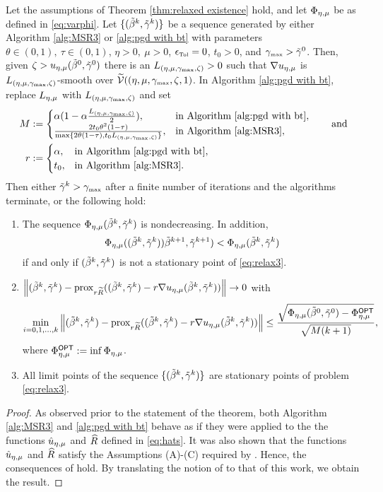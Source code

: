 \begin{theorem}\label{thm:convergence}
Let the assumptions of Theorem \ref{thm:relaxed existence} hold, and
let $\Phi_{\eta,\mu}$ be as defined in \eqref{eq:varphi}. 
Let $\{(\tilde\beta^k,{\tilde{\gamma}}^k)\}$ be a sequence generated
by either Algorithm \ref{alg:MSR3} or \ref{alg:pgd with bt} 
with parameters 
$\theta\in(0,1),\ \tau\in(0,1)$,
$\eta>0,\ \mu>0$, $\epsilon_{\mbox{\tiny Tol}}=0$,
$t_0>0$, and ${\gamma_{\mbox{\tiny max}}}>{\tilde{\gamma}}^0$. 
Then, given $\zeta>{u_{\eta,\mu}}(\tilde\beta^0,{\tilde{\gamma}}^0)$ there is an 
$L_{({\eta,\mu},{\gamma_{\mbox{\tiny max}}},\zeta)}>0$ such that $\nabla{u_{\eta,\mu}}$ is 
$L_{({\eta,\mu},{\gamma_{\mbox{\tiny max}}},\zeta)}$-smooth over 
$\widetilde{{\mathcal{V}}}(({\eta,\mu},{\gamma_{\mbox{\tiny max}}},\zeta,1)$. 
In Algorithm \ref{alg:pgd with bt}, replace 
$L_{\eta,\mu}$ with $L_{({\eta,\mu},{\gamma_{\mbox{\tiny max}}},\zeta)}$ and set
 \[
 \begin{aligned}
 M&:=\begin{cases}
 \alpha(1-\alpha\frac{L_{({\eta,\mu},{\gamma_{\mbox{\tiny max}}},\zeta)}}{2}),&
 \mbox{in Algorithm \ref{alg:pgd with bt}},
 \\
 \frac{2t_0\theta^2(1-\tau)}{\max\{2\theta(1-\tau),t_0L_{({\eta,\mu},{\gamma_{\mbox{\tiny max}}},\zeta)}\}},&
 \mbox{in Algorithm \ref{alg:MSR3}},
 \end{cases}
 \qquad\text{and}
 \\
 r&:=
 \begin{cases}
 \alpha,&
 \mbox{in Algorithm \ref{alg:pgd with bt}},
 \\
t_0,&
 \mbox{in Algorithm \ref{alg:MSR3}}.
 \end{cases}
 \end{aligned}\]
Then either ${\tilde{\gamma}}^k>{\gamma_{\mbox{\tiny max}}}$ after a finite number of iterations and the algorithms terminate, or the 
following hold:
\begin{enumerate}
\item
The sequence $\Phi_{\eta,\mu}(\tilde\beta^k,{\tilde{\gamma}}^k)$ is nondecreasing.
In addition, \[\Phi_{\eta,\mu}((\tilde\beta^k,{\tilde{\gamma}}^k))\tilde\beta^{k+1},{\tilde{\gamma}}^{k+1})<\Phi_{\eta,\mu}(\tilde\beta^k,{\tilde{\gamma}}^k)\]
if and only if $(\tilde\beta^k,{\tilde{\gamma}}^k)$ is not a stationary point of \eqref{eq:relax3}.
\item
$\left\Vert (\tilde\beta^k,{\tilde{\gamma}}^k)-{\mathrm{prox}}_{r{\widetilde R}}((\tilde\beta^k,{\tilde{\gamma}}^k)-r\nabla u_{\eta,\mu}(\tilde\beta^k,{\tilde{\gamma}}^k))\right\Vert\rightarrow 0$ with
\[
\min_{i=0,1,\dots,k}\left\Vert (\tilde\beta^k,{\tilde{\gamma}}^k)-{\mathrm{prox}}_{r{\widetilde R}}((\tilde\beta^k,{\tilde{\gamma}}^k)-r\nabla u_{\eta,\mu}(\tilde\beta^k,{\tilde{\gamma}}^k))\right\Vert
\le \frac{\sqrt{\Phi_{\eta,\mu}(\tilde\beta^0,{\tilde{\gamma}}^0)-\Phi_{\eta,\mu}^\mathsf{OPT}}}
{\sqrt{M(k+1)}},
\]
where $\Phi_{\eta,\mu}^\mathsf{OPT}:=\inf \Phi_{\eta,\mu}$.
\item
All limit points of the sequence $\{(\tilde\beta^k,{\tilde{\gamma}}^k)\}$ are stationary points of
problem \eqref{eq:relax3}.
\end{enumerate}
\end{theorem}
\begin{proof}
As observed prior to the statement of the theorem, 
both Algorithm \ref{alg:MSR3} and \ref{alg:pgd with bt}
behave as if they were applied to the the functions 
$\hat u_{\eta,\mu}$ and ${\widehat R}$ defined in \eqref{eq:hats}. 
It was also shown that the functions $\hat u_{\eta,\mu}$ and ${\widehat R}$
satisfy the Assumptions (A)-(C) required by \cite[Theorem 10.15]{AB17}.
Hence, the consequences of \cite[Theorem 10.15]{AB17} hold.
By translating the notion of \cite[Theorem 10.15]{AB17} to that of this work,
we obtain the result.
\end{proof}

